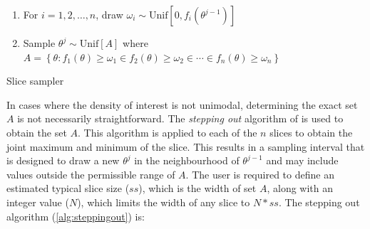 \documentclass[article]{jss}
\begin{document}
%
\begin{algorithm}[H]
\begin{enumerate}
\item For $i=1,2,\dots,n$, draw $\omega_{i}\sim\mbox{Unif}[0,f_{i}(\theta^{j-1})]$ 
\item Sample $\theta^{j}\sim\mbox{Unif}[A]$ where $A=\left\{ \theta:f_{1}(\theta)\ge\omega_{1}\in f_{2}(\theta)\ge\omega_{2}\in\cdots\in f_{n}(\theta)\ge\omega_{n}\right\} $ 
\end{enumerate}
\caption{Slice sampler}
\label{alg:slicesamp}
\end{algorithm}


In cases where the density of interest is not unimodal, determining
the exact set $A$ is not necessarily straightforward. The
\emph{stepping out} algorithm of \citet{Radford2003} is used to obtain
the set $A$.  This algorithm is applied to each of the $n$ slices to
obtain the joint maximum and minimum of the slice. This results in a
sampling interval that is designed to draw a new $\theta^{j}$ in the
neighbourhood of $\theta^{j-1}$ and may include values outside the
permissible range of $A$. The user is required to define an estimated
typical slice size ($ss$), which is the width of set $A$, along with
an integer value ($N$), which limits the width of any slice to $N*ss$.
The stepping out algorithm (\ref{alg:steppingout}) is:
\end{document}
